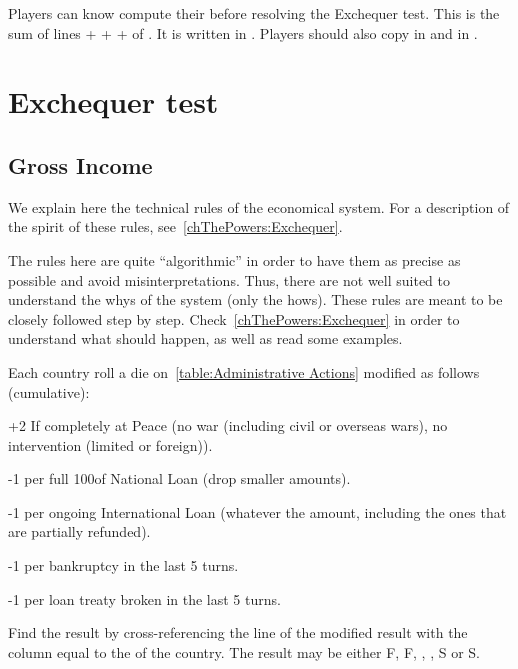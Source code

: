 \bparag Players can know compute their \RT before resolving the Exchequer
test.
\bparag This is the sum of lines  +
 +  +
 of \EcoRS. It is written in .
\bparag Players should also copy  in
 and  in
.

\section{Exchequer test}\label{chBudget:Exchequer test}
\subsection{Gross Income}
\begin{designnote}
  We explain here the technical rules of the economical system. For a
  description of the spirit of these rules, see~\ref{chThePowers:Exchequer}.

  The rules here are quite ``algorithmic'' in order to have them as precise as
  possible and avoid misinterpretations. Thus, there are not well suited to
  understand the whys of the system (only the hows). These rules are meant to
  be closely followed step by step. Check~\ref{chThePowers:Exchequer} in order
  to understand what should happen, as well as read some examples.
\end{designnote}

 Each country roll a die on~\ref{table:Administrative
  Actions} modified as follows (cumulative):
\begin{modlist}
\item[+2] If completely at Peace (no war (including civil or overseas wars),
  no intervention (limited or foreign)).
\item[-1 ] per full 100\ducats of National Loan (drop smaller amounts).
\item[-1] per ongoing International Loan (whatever the amount, including the
  ones that are partially refunded).
\item[-1 ] per bankruptcy in the last 5 turns.
\item[-1] per loan treaty broken in the last 5 turns.
\end{modlist}
\bparag Find the result by cross-referencing the line of the modified result
with the column equal to the \STAB of the country.
\bparag The result may be either F\textetoile, F, \undemi, \undemi\textetoile,
S or S\textetoile.

